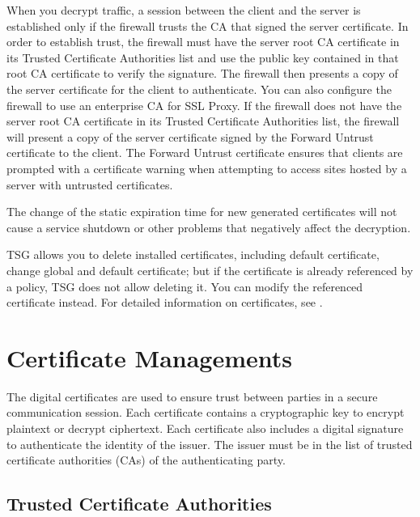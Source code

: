 When you decrypt traffic, a session between the client and the server is established only if the firewall trusts the CA that signed the server certificate. In order to establish trust, the firewall must have the server root CA certificate in its Trusted Certificate Authorities list and use the public key contained in that root CA certificate to verify the signature. The firewall then presents a copy of the server certificate for the client to authenticate. You can also configure the firewall to use an enterprise CA for SSL Proxy. If the firewall does not have the server root CA certificate in its Trusted Certificate Authorities list, the firewall will present a copy of the server certificate signed by the Forward Untrust certificate to the client. The Forward Untrust certificate ensures that clients are prompted with a certificate warning when attempting to access sites hosted by a server with untrusted certificates.


The change of the static expiration time for new generated certificates will not cause a service shutdown or other problems that negatively affect the decryption.


TSG allows you to delete installed certificates, including default certificate, change global and default certificate; 
but if the certificate is already referenced by a policy, TSG does not allow deleting it. You can modify the referenced certificate instead. 
For detailed information on certificates, see \hyperlink{link:Certificate Management}{\color{linkblue}{Certificate Management}}.

\section*{\hypertarget{link:Certificate Managements}{Certificate Managements}}
\label{sec:decrypt:certificate}

The digital certificates are used to ensure trust between parties in a secure communication session. Each certificate contains a cryptographic key to encrypt plaintext or decrypt ciphertext. Each certificate also includes a digital signature to authenticate the identity of the issuer. The issuer must be in the list of trusted certificate authorities (CAs) of the authenticating party.

\subsection*{\hypertarget{link:Trusted Certificate Authorities}{Trusted Certificate Authorities}}
\label{sec:decrypt:certificate:trusted}

